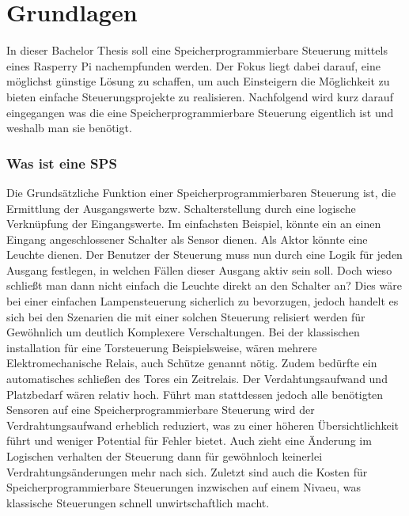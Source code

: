 \section{Grundlagen}\label{kap:grund}

In dieser Bachelor Thesis soll eine Speicherprogrammierbare Steuerung mittels eines Rasperry Pi nachempfunden werden. Der Fokus liegt dabei darauf, eine möglichst günstige Lösung zu schaffen, um auch Einsteigern die Möglichkeit zu bieten einfache Steuerungsprojekte zu realisieren. Nachfolgend wird kurz darauf eingegangen was die eine Speicherprogrammierbare Steuerung eigentlich ist und weshalb man sie benötigt. 
\subsubsection{Was ist eine SPS}
Die Grundsätzliche Funktion einer Speicherprogrammierbaren Steuerung ist, die Ermittlung der Ausgangswerte bzw. Schalterstellung durch eine logische Verknüpfung der Eingangswerte. Im einfachsten Beispiel, könnte ein an einen Eingang angeschlossener Schalter als Sensor dienen. Als Aktor könnte eine Leuchte dienen. Der Benutzer der Steuerung muss nun durch eine Logik für jeden Ausgang festlegen, in welchen Fällen dieser Ausgang aktiv sein soll. Doch wieso schließt man dann nicht einfach die Leuchte direkt an den Schalter an? Dies wäre bei einer einfachen Lampensteuerung sicherlich zu bevorzugen, jedoch handelt es sich bei den Szenarien die mit einer solchen Steuerung relisiert werden für Gewöhnlich um deutlich Komplexere Verschaltungen. Bei der klassischen installation für eine Torsteuerung Beispielsweise, wären mehrere Elektromechanische Relais, auch Schütze genannt nötig. Zudem bedürfte ein automatisches schließen des Tores ein Zeitrelais. Der Verdahtungsaufwand und Platzbedarf wären relativ hoch. Führt man stattdessen jedoch alle benötigten Sensoren auf eine Speicherprogrammierbare Steuerung wird der Verdrahtungsaufwand erheblich reduziert, was zu einer höheren Übersichtlichkeit führt und weniger Potential für Fehler bietet. Auch zieht eine Änderung im Logischen verhalten der Steuerung dann für gewöhnloch keinerlei Verdrahtungsänderungen mehr nach sich. Zuletzt sind auch die Kosten für Speicherprogrammierbare Steuerungen inzwischen auf einem Nivaeu, was klassische Steuerungen schnell unwirtschaftlich macht. 


